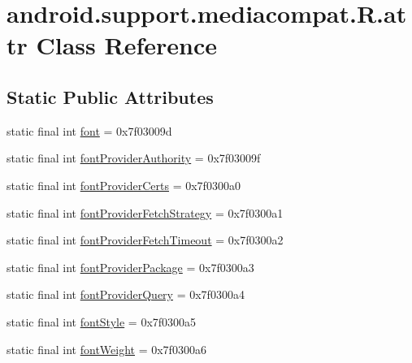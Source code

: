 \hypertarget{classandroid_1_1support_1_1mediacompat_1_1R_1_1attr}{}\section{android.\+support.\+mediacompat.\+R.\+attr Class Reference}
\label{classandroid_1_1support_1_1mediacompat_1_1R_1_1attr}
\subsection*{Static Public Attributes}
\begin{DoxyCompactItemize}
\item 
static final int \mbox{\hyperlink{classandroid_1_1support_1_1mediacompat_1_1R_1_1attr_ade19dd71a2fbc3dcb0f6095fec0e920c}{font}} = 0x7f03009d
\item 
static final int \mbox{\hyperlink{classandroid_1_1support_1_1mediacompat_1_1R_1_1attr_a356001d5c6796ec75338d076da4a3211}{font\+Provider\+Authority}} = 0x7f03009f
\item 
static final int \mbox{\hyperlink{classandroid_1_1support_1_1mediacompat_1_1R_1_1attr_ad586cf049fe9effed477b793ce2ce6a7}{font\+Provider\+Certs}} = 0x7f0300a0
\item 
static final int \mbox{\hyperlink{classandroid_1_1support_1_1mediacompat_1_1R_1_1attr_a9b78e7794428aea6616b3ce978c68ea8}{font\+Provider\+Fetch\+Strategy}} = 0x7f0300a1
\item 
static final int \mbox{\hyperlink{classandroid_1_1support_1_1mediacompat_1_1R_1_1attr_a6af382791cc57dc6799ca1be4027e2a7}{font\+Provider\+Fetch\+Timeout}} = 0x7f0300a2
\item 
static final int \mbox{\hyperlink{classandroid_1_1support_1_1mediacompat_1_1R_1_1attr_ae9289e05813d9f2b3bf09e8954180d06}{font\+Provider\+Package}} = 0x7f0300a3
\item 
static final int \mbox{\hyperlink{classandroid_1_1support_1_1mediacompat_1_1R_1_1attr_af36c254766862b797dd49eec49303645}{font\+Provider\+Query}} = 0x7f0300a4
\item 
static final int \mbox{\hyperlink{classandroid_1_1support_1_1mediacompat_1_1R_1_1attr_ae0a3a36b1f13e9a01be878948552ffd1}{font\+Style}} = 0x7f0300a5
\item 
static final int \mbox{\hyperlink{classandroid_1_1support_1_1mediacompat_1_1R_1_1attr_a9e377e9a8ae6b121f0bb76fffa0516c7}{font\+Weight}} = 0x7f0300a6
\end{DoxyCompactItemize}


